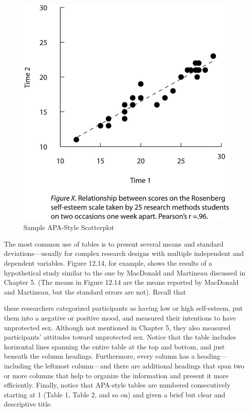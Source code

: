 \begin{figure}
\includegraphics[width=.7\linewidth]{figures/Fig12-13}
\caption{Sample APA-Style Scatterplot}
\label{fig:apascatter}
\end{figure}


The most common use of tables is to present several means and standard deviations---usually for complex research designs with multiple independent and dependent variables. Figure 12.14, for example, shows the results of a hypothetical study similar to the one by MacDonald and Martineau \citeyear{macdonald_self-esteem_2002} discussed in Chapter 5. (The means in Figure 12.14 are the means reported by MacDonald and Martineau, but the standard errors are not). Recall that

these researchers categorized participants as having low or high self-esteem, put them into a negative or positive mood, and measured their intentions to have unprotected sex. Although not mentioned in Chapter 5, they also measured participants' attitudes toward unprotected sex. Notice that the table includes horizontal lines spanning the entire table at the top and bottom, and just beneath the column headings. Furthermore, every column has a heading---including the leftmost column---and there are additional headings that span two or more columns that help to organize the information and present it more efficiently. Finally, notice that APA-style tables are numbered consecutively starting at 1 (Table 1, Table 2, and so on) and given a brief but clear and descriptive title.


